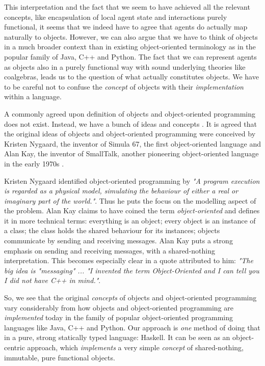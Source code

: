 \medskip

This interpretation and the fact that we seem to have achieved all the relevant concepts, like encapsulation of local agent state and interactions purely functional, it seems that we indeed have to agree that agents do actually map naturally to objects. However, we can also argue that we have to think of objects in a much broader context than in existing object-oriented terminology as in the popular family of Java, C++ and Python. The fact that we can represent agents as objects also in a purely functional way with sound underlying theories like coalgebras, leads us to the question of what actually constitutes objects. We have to be careful not to confuse the \textit{concept} of objects with their \textit{implementation} within a language.

A commonly agreed upon definition of objects and object-oriented programming does not exist. Instead, we have a bunch of ideas and concepts \cite{definitionsforoo}. It is agreed that the original ideas of objects and object-oriented programming were conceived by Kristen Nygaard, the inventor of Simula 67, the first object-oriented language \cite{dahl_birth_2002} and Alan Kay, the inventor of SmallTalk, another pioneering object-oriented language in the early 1970s \cite{kay_early_1993}. %

Kristen Nygaard identified object-oriented programming by \textit{"A program execution is regarded as a physical model, simulating the behaviour of either a real or imaginary part of the world."}. Thus he puts the focus on the modelling aspect of the problem. Alan Kay claims to have coined the term \textit{object-oriented} and defines it in more technical terms: everything is an object; every object is an instance of a class; the class holds the shared behaviour for its instances; objects communicate by sending and receiving messages. Alan Kay puts a strong emphasis on sending and receiving messages, with a shared-nothing interpretation. This becomes especially clear in a quote attributed to him: \textit{"The big idea is "messaging" ... "I invented the term Object-Oriented and I can tell you I did not have C++ in mind."}.

\medskip

So, we see that the original \textit{concepts} of objects and object-oriented programming vary considerably from how objects and object-oriented programming are \textit{implemented} today in the family of popular object-oriented programming languages like Java, C++ and Python.
Our approach is \textit{one} method of doing that in a pure, strong statically typed language: Haskell. It can be seen as an object-centric approach, which \textit{implements} a very simple \textit{concept} of shared-nothing, immutable, pure functional objects.

